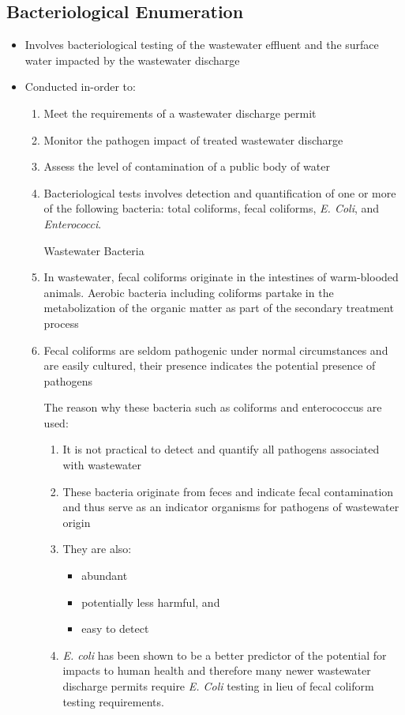 \subsection{Bacteriological Enumeration}

\begin{itemize}
	\item Involves bacteriological testing of the wastewater effluent and the surface water impacted by the wastewater discharge
	
	\item Conducted in-order to:
		\begin{enumerate}
			\item Meet the requirements of a wastewater discharge permit
			\item Monitor the pathogen impact of treated wastewater discharge
			\item Assess the level of contamination of a public body of water
			\item Bacteriological tests involves detection and quantification of one or more of the following bacteria:  total coliforms, fecal coliforms, \textit{E. Coli}, and \textit{Enterococci}. 
\begin{center}
Wastewater Bacteria
\end{center}
	
	\item  In wastewater, fecal coliforms originate in the intestines of warm-blooded animals.  Aerobic bacteria including coliforms partake in the metabolization of the organic matter as part of the secondary treatment process
\item Fecal coliforms are seldom pathogenic under normal circumstances and are easily cultured, their presence indicates the potential presence of pathogens

The reason why these bacteria such as coliforms and enterococcus are used:
		\begin{enumerate}
			\item It is not practical to detect and quantify all pathogens associated with wastewater
			\item These bacteria originate from feces and indicate fecal contamination and thus serve as an indicator organisms for pathogens of wastewater origin
			\item They are also:
				\begin{itemize}
					\item abundant
					\item potentially less harmful, and
					\item easy to detect
				\end{itemize}
			\item \textit{E. coli} has been shown to be a better predictor of the potential for impacts to human health and therefore many newer wastewater discharge permits require \textit{E. Coli} testing in lieu of fecal coliform testing requirements.
		\end{enumerate}
		\end{enumerate}

\end{itemize}
 

